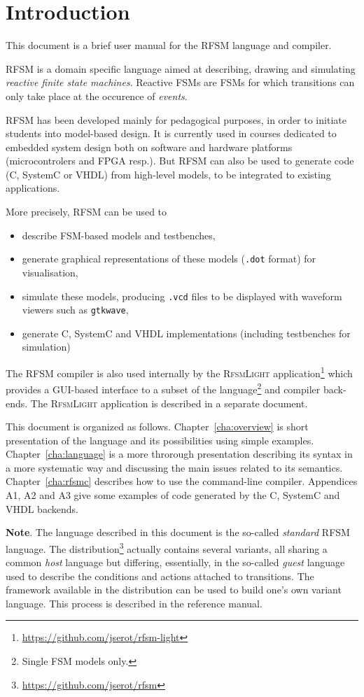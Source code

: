 \chapter{Introduction}
\label{chap:intro}

This document is a brief user manual for the RFSM language and compiler.

\medskip
RFSM is a domain specific language aimed at describing, drawing and simulating \emph{reactive finite state
  machines}. Reactive FSMs are FSMs for which transitions can only take place at the occurence of
\emph{events}.

\medskip
RFSM has been developed mainly for pedagogical purposes, in order to initiate students into
model-based design. It is currently used in courses dedicated to embedded system design both on
software and hardware platforms (microcontrolers and FPGA resp.). But RFSM can also be used to
generate code (C, SystemC or VHDL) from high-level models, to be integrated to existing applications.

\medskip
More precisely, RFSM can be used to
\begin{itemize}
\item describe FSM-based models and testbenches,
\item generate graphical representations of these models (\verb|.dot| format) for visualisation,
\item simulate these models, producing \verb|.vcd| files to be displayed with waveform viewers such
  as \texttt{gtkwave},
\item generate C, SystemC and VHDL implementations (including testbenches for simulation)
\end{itemize}

\medskip
The RFSM compiler is also used internally by the \textsc{RfsmLight}
application\footnote{\url{https://github.com/jserot/rfsm-light}} which provides a GUI-based interface to a
subset of the language\footnote{Single FSM models only.} and compiler back-ends. The
\textsc{RfsmLight} application is described in a separate document.

\medskip
This document is organized as follows.
Chapter~\ref{cha:overview} is short presentation of the language and its possibilities using simple
examples. Chapter~\ref{cha:language} is a more throrough presentation describing its syntax in a more
systematic way and discussing the main issues related to its semantics.
Chapter~\ref{cha:rfsmc} describes how to use the command-line compiler. Appendices
A1, A2 and A3 give some examples of code generated by the C, SystemC and VHDL backends.

\medskip
\textbf{Note}. The language described in this document is the so-called \emph{standard} RFSM language. The
distribution\footnote{\url{https://github.com/jserot/rfsm}} actually contains several variants, all
sharing a common \emph{host} language but differing, essentially, in the so-called \emph{guest} language used to describe
the conditions and actions attached to transitions. The framework available in the distribution
can be used to build one's own variant language. This process is described in the reference manual. 

